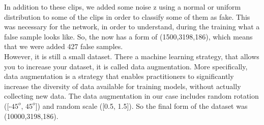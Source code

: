 In addition to these clips, we added some noise z using a normal or uniform distribution to some of the clips in order to classify some of them as fake. This was necessary for the network, in order to understand, during the training what a  false sample looks like. So, the now has a form of (1500,3198,186), which means that we were added 427 false samples. \\

However, it is still a small dataset. There a machine learning strategy, that allows you to increase your dataset, it is called data augmentation. More specifically, data augmentation is a strategy that enables practitioners to significantly increase the diversity of data available for training models, without actually collecting new data. The data augmentation in our case includes random rotation ([-$45^o$, $45^o$]) and random scale ([0.5, 1.5]). So the final form of the dataset was (10000,3198,186).